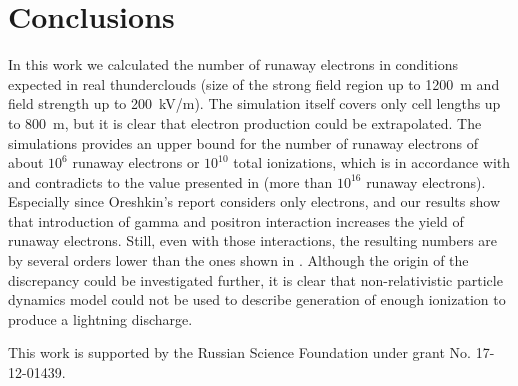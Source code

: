 \documentclass[doublecol,linenumbers]{epl2} %
\begin{document}
\section{Conclusions}

In this work we calculated the number of runaway electrons in conditions expected in real thunderclouds (size of the strong field region up to 1200~m and field strength up to 200~kV/m). The simulation itself covers only cell lengths up to 800~m, but it is clear that electron production could be extrapolated. The simulations provides an upper bound for the number of runaway electrons of about $10^6$ runaway electrons or $10^{10}$ total ionizations, which is in accordance with \cite{Gurevich:2001, Dwyer2013_radio} and contradicts to the value presented in \cite{Oreshkin_2018} (more than $10^{16}$ runaway electrons). Especially since Oreshkin’s report considers only electrons, and our results show that introduction of gamma and positron interaction increases the yield of runaway electrons.
Still, even with those interactions, the resulting numbers are by several orders lower than the ones shown in \cite{Oreshkin_2018}. Although the origin of the discrepancy could be investigated further, it is clear that non-relativistic particle dynamics model could not be used to describe generation of enough ionization to produce a lightning discharge.
%

 

\acknowledgments
This work is supported by the Russian Science Foundation under grant No. 17-12-01439.




\end{document}
